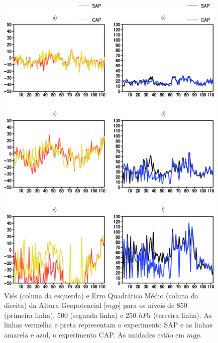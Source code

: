\break

\begin{figure}[!h]
\centering
\includegraphics[height=15cm]{./figs/vies_eqm-zgeo.png}
\caption{Viés (coluna da esquerda) e Erro Quadrático Médio (coluna da direita) da Altura Geopotencial [$mgp$] para os níveis de 850 (primeira linha), 500 (segunda linha) e 250 $hPa$ (terceira linha). As linhas vermelha e preta representam o experimento SAP e as linhas amarela e azul, o experimento CAP. As unidades estão em $mgp$.}
\label{fig30a}
\end{figure}

\break

